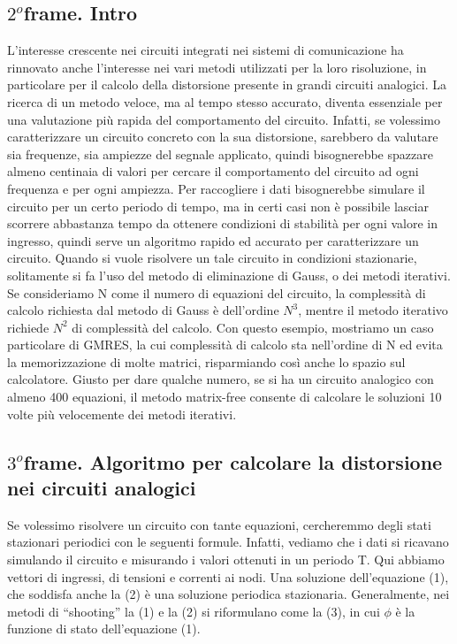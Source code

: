 \documentclass[a4paper]{article}
\begin{document}
\subsection*{$2^o$frame. Intro}
L’interesse crescente nei circuiti integrati nei sistemi di comunicazione ha rinnovato anche l’interesse nei vari metodi utilizzati per la loro risoluzione, in particolare per il calcolo della distorsione presente in grandi circuiti analogici. La ricerca di un metodo veloce, ma al tempo stesso accurato, diventa essenziale per una valutazione più rapida del comportamento del circuito. 
Infatti, se volessimo caratterizzare un circuito concreto con la sua distorsione, sarebbero da valutare sia frequenze, sia ampiezze del segnale applicato, quindi bisognerebbe spazzare almeno centinaia di valori per cercare il comportamento del circuito ad ogni frequenza e per ogni ampiezza.
Per raccogliere i dati bisognerebbe simulare il circuito per un certo periodo di tempo, ma in certi casi non è possibile lasciar scorrere abbastanza tempo da ottenere condizioni di stabilità per ogni valore in ingresso, quindi serve un algoritmo rapido ed accurato per caratterizzare un circuito.
Quando si vuole risolvere un tale circuito in condizioni stazionarie, solitamente si fa l’uso del metodo di eliminazione di Gauss, o dei metodi iterativi. Se consideriamo N come il numero di equazioni del circuito, la complessità di calcolo richiesta dal metodo di Gauss è dell’ordine $N^3$, mentre il metodo iterativo richiede $N^2$ di complessità del calcolo. Con questo esempio, mostriamo un caso particolare di GMRES, la cui complessità di calcolo sta nell’ordine di N ed evita la memorizzazione di molte matrici, risparmiando così anche lo spazio sul calcolatore. 
Giusto per dare qualche numero, se si ha un circuito analogico con almeno 400 equazioni, il metodo matrix-free consente di calcolare le soluzioni 10 volte più velocemente dei metodi iterativi.
\subsection*{$3^o$frame. Algoritmo per calcolare la distorsione nei circuiti analogici}
Se volessimo risolvere un circuito con tante equazioni, cercheremmo degli stati stazionari periodici con le seguenti formule.
Infatti, vediamo che i dati si ricavano simulando il circuito e misurando i valori ottenuti in un periodo T. Qui abbiamo vettori di ingressi, di tensioni e correnti ai nodi. Una soluzione dell’equazione (1), che soddisfa anche la (2) è una soluzione periodica stazionaria.
Generalmente, nei metodi di “shooting” la (1) e la (2) si riformulano come la (3), in cui $\phi$ è la funzione di stato dell’equazione (1).
\end{document}
